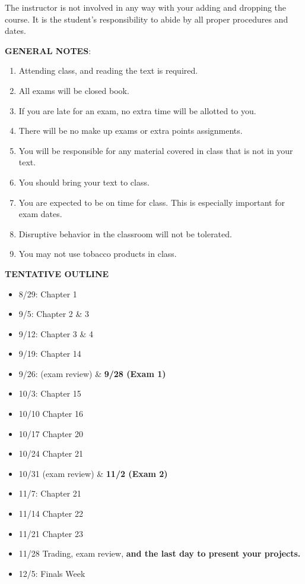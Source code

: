 \documentclass{article}
\begin{document}
The instructor is not involved in any way with your adding and dropping the course.  It is the student's responsibility to abide by all proper procedures and dates.  \\
\begin{center}
{\bf GENERAL NOTES}:
\end{center}
\begin{enumerate}
\item Attending class, and reading the text is required.
\item All exams will be closed book.
\item If you are late for an exam, no extra time will be allotted to you.
\item There will be no make up exams or extra points assignments.
\item You will be responsible for any material covered in class that is not in your text.
\item You should bring your text to class.
\item You are expected to be on time for class. This is especially important for exam
dates.
\item Disruptive behavior in the classroom will not be tolerated.
\item You may not use tobacco products in class.
\end{enumerate}
\begin{center}
\vspace*{5pt}
{\bf TENTATIVE OUTLINE}
\end{center}
\begin{itemize}
\item 8/29: Chapter 1
\item 9/5:  Chapter 2 \& 3
\item 9/12: Chapter 3 \& 4
\item 9/19: Chapter 14
\item 9/26: (exam review) \& {\bf 9/28 (Exam 1)}
\item 10/3: Chapter 15
\item 10/10 Chapter 16
\item 10/17 Chapter 20
\item 10/24 Chapter 21
\item 10/31 (exam review) \& {\bf 11/2 (Exam 2)}
\item 11/7: Chapter 21
\item 11/14 Chapter 22
\item 11/21 Chapter 23
\item 11/28 Trading, exam review, {\bf and the last day to present your projects.}
\item 12/5: Finals Week
\end{itemize}
\end{document}
